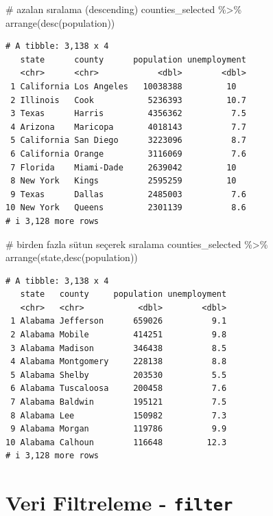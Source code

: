 \documentclass[
  letterpaper,
  DIV=11,
  numbers=noendperiod]{scrreprt}
\newenvironment{Shaded}{\begin{snugshade}}{\end{snugshade}}
\newcommand{\CommentTok}[1]{\textcolor[rgb]{0.37,0.37,0.37}{#1}}
\newcommand{\FunctionTok}[1]{\textcolor[rgb]{0.28,0.35,0.67}{#1}}
\newcommand{\NormalTok}[1]{\textcolor[rgb]{0.00,0.23,0.31}{#1}}
\newcommand{\SpecialCharTok}[1]{\textcolor[rgb]{0.37,0.37,0.37}{#1}}
\begin{document}
\begin{Shaded}
\begin{Highlighting}[]
\CommentTok{\# azalan sıralama (descending)}
\NormalTok{counties\_selected }\SpecialCharTok{\%\textgreater{}\%}
\FunctionTok{arrange}\NormalTok{(}\FunctionTok{desc}\NormalTok{(population))}
\end{Highlighting}
\end{Shaded}

\begin{verbatim}
# A tibble: 3,138 x 4
   state      county      population unemployment
   <chr>      <chr>            <dbl>        <dbl>
 1 California Los Angeles   10038388         10  
 2 Illinois   Cook           5236393         10.7
 3 Texas      Harris         4356362          7.5
 4 Arizona    Maricopa       4018143          7.7
 5 California San Diego      3223096          8.7
 6 California Orange         3116069          7.6
 7 Florida    Miami-Dade     2639042         10  
 8 New York   Kings          2595259         10  
 9 Texas      Dallas         2485003          7.6
10 New York   Queens         2301139          8.6
# i 3,128 more rows
\end{verbatim}

\begin{Shaded}
\begin{Highlighting}[]
\CommentTok{\# birden fazla sütun seçerek sıralama}
\NormalTok{counties\_selected }\SpecialCharTok{\%\textgreater{}\%}
\FunctionTok{arrange}\NormalTok{(state,}\FunctionTok{desc}\NormalTok{(population))}
\end{Highlighting}
\end{Shaded}

\begin{verbatim}
# A tibble: 3,138 x 4
   state   county     population unemployment
   <chr>   <chr>           <dbl>        <dbl>
 1 Alabama Jefferson      659026          9.1
 2 Alabama Mobile         414251          9.8
 3 Alabama Madison        346438          8.5
 4 Alabama Montgomery     228138          8.8
 5 Alabama Shelby         203530          5.5
 6 Alabama Tuscaloosa     200458          7.6
 7 Alabama Baldwin        195121          7.5
 8 Alabama Lee            150982          7.3
 9 Alabama Morgan         119786          9.9
10 Alabama Calhoun        116648         12.3
# i 3,128 more rows
\end{verbatim}

\section*{\texorpdfstring{Veri Filtreleme -
\texttt{filter}}{Veri Filtreleme - filter}}\label{veri-filtreleme---filter}
\end{document}
